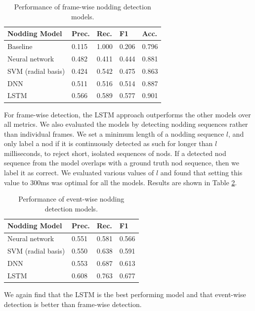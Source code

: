 \documentclass[letterpaper]{article} %
\begin{document}
\begin{table}[h]
\begin{center}
\begin{tabular}{|l|l|l|l|l|}
\hline \bf Nodding Model & \bf Prec. & \bf Rec. & \bf F1 & \bf Acc. \\ \hline
Baseline & 0.115 & 1.000 & 0.206 & 0.796\\
Neural network & 0.482 & 0.411 & 0.444 & 0.881\\
SVM (radial basis) & 0.424 & 0.542 & 0.475 & 0.863\\
DNN & 0.511 & 0.516 & 0.514 & 0.887\\
LSTM & 0.566 & 0.589 & 0.577 & 0.901\\
\hline
\end{tabular}
\end{center}
\caption{\label{nodresults} Performance of frame-wise nodding detection models.}
\end{table}

For frame-wise detection, the LSTM approach outperforms the other models over all metrics. We also evaluated the models by detecting nodding sequences rather than individual frames. We set a minimum length of a nodding sequence $l$, and only label a nod if it is continuously detected as such for longer than $l$ milliseconds, to reject short, isolated sequences of nods. If a detected nod sequence from the model overlaps with a ground truth nod sequence, then we label it as correct. We evaluated various values of $l$ and found that setting this value to 300ms was optimal for all the models. Results are shown in Table \ref{nodresultsevent}.

\begin{table}[h]
\begin{center}
\begin{tabular}{|l|l|l|l|}
\hline \bf Nodding Model & \bf Prec. & \bf Rec. & \bf F1\\ \hline
Neural network & 0.551 & 0.581 & 0.566 \\
SVM (radial basis) & 0.550 & 0.638 & 0.591 \\
DNN & 0.553 & 0.687 & 0.613 \\
LSTM & 0.608 & 0.763 & 0.677 \\
\hline
\end{tabular}
\end{center}
\caption{\label{nodresultsevent} Performance of event-wise nodding detection models.}
\end{table}

We again find that the LSTM is the best performing model and that event-wise detection is better than frame-wise detection.
\end{document}
